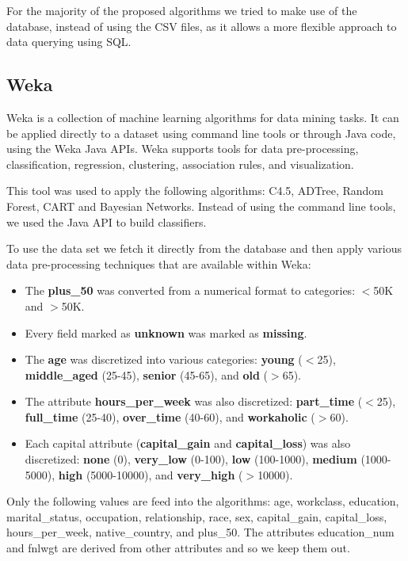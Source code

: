 \documentclass[a4paper]{llncs}
\begin{document}
For the majority of the proposed algorithms we tried to make use of the database, instead
of using the CSV files, as it allows a more flexible approach to data querying using SQL.

\subsection{Weka}

Weka is a collection of machine learning algorithms for data mining tasks. \cite{weka}
It can be applied directly to a dataset using command line tools or through Java code, using the Weka Java APIs.
Weka supports tools for data pre-processing, classification, regression, clustering, association rules,
and visualization.

This tool was used to apply the following algorithms: C4.5, ADTree, Random Forest, CART and Bayesian Networks.
Instead of using the command line tools, we used the Java API to build classifiers.

To use the data set we fetch it directly from the database and then apply various data pre-processing
techniques that are available within Weka:

\begin{itemize}
  \item The \textbf{plus\_50} was converted from a numerical format to categories: $<$50K and $>$50K.
  \item Every field marked as \textbf{unknown} was marked as \textbf{missing}.
  \item The \textbf{age} was discretized into various categories: \textbf{young} ($<$25),
    \textbf{middle\_aged} (25-45), \textbf{senior} (45-65), and \textbf{old} ($>$65).
  \item The attribute \textbf{hours\_per\_week} was also discretized: \textbf{part\_time} ($<$25),
    \textbf{full\_time} (25-40), \textbf{over\_time} (40-60), and \textbf{workaholic} ($>$60).
  \item Each capital attribute (\textbf{capital\_gain} and \textbf{capital\_loss}) was also discretized:
    \textbf{none} (0), \textbf{very\_low} (0-100), \textbf{low} (100-1000), \textbf{medium} (1000-5000),
    \textbf{high} (5000-10000), and \textbf{very\_high} ($>$10000).
\end{itemize}

Only the following values are feed into the algorithms: age, workclass, education,
marital\_status, occupation, relationship, race, sex, capital\_gain, capital\_loss,
hours\_per\_week, native\_country, and plus\_50. The attributes education\_num
and fnlwgt are derived from other attributes and so we keep them out.
\end{document}
